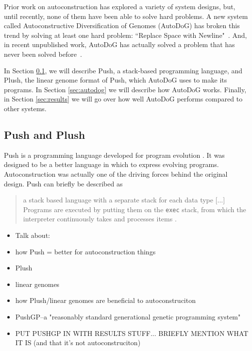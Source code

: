 \documentclass{sig-alternate}
\begin{document}
Prior work on autoconstruction has explored a variety of system designs, but, until recently, none of them have been able to solve hard problems. A new system called Autoconstructive Diversification of Genomes (AutoDoG) has broken this trend by solving at least one hard problem: ``Replace Space with Newline"~\cite{spector:2016}. And, in recent unpublished work, AutoDoG has actually solved a problem that has never been solved before~\cite{Eva:autoconstruction}.

In Section \ref{sec:push}, we will describe Push, a stack-based programming language, and Plush, the linear genome format of Push, which AutoDoG uses to make its programs. In Section \ref{sec:autodog} we will describe how AutoDoG works. Finally, in Section \ref{sec:results} we will go over how well AutoDoG performs compared to other systems.

\subsection{Push and Plush}
\label{sec:push}

Push is a programming language developed for program evolution \cite{spector:2016}. It was designed to be a better language in which to express evolving programs. Autoconstruction was actually one of the driving forces behind the original design. Push can briefly be described as

\begin{quotation}
	a stack based language with a separate stack for each data type [...] Programs are executed by putting them on the \texttt{exec} stack, from which the interpreter continuously takes and processes items \cite{spector:2016}.
\end{quotation}


\begin{itemize}
	\item Talk about:
	\item how Push = better for autoconstruction things
	\item Plush
	\item linear genomes
	\item how Plush/linear genomes are beneficial to autoconstruciton
	\item PushGP--a "reasonably standard generational genetic programming system"
	\item PUT PUSHGP IN WITH RESULTS STUFF... BRIEFLY MENTION WHAT IT IS (and that it's not autoconstruciton)
\end{itemize}
\end{document}
